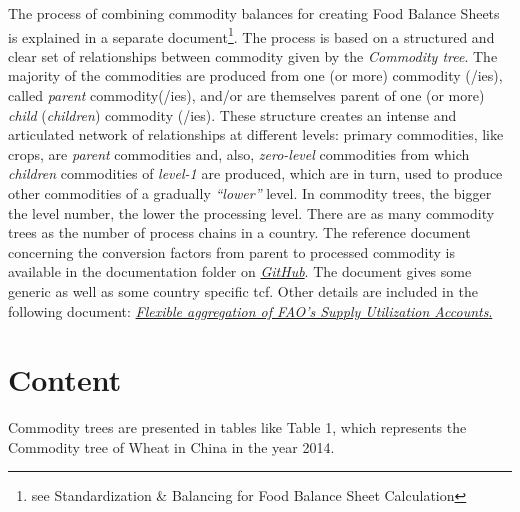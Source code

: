 \documentclass[]{article}
\let\rmarkdownfootnote\footnote%
\def\footnote{\protect\rmarkdownfootnote}
\begin{document}
The process of combining commodity balances for creating Food Balance
Sheets is explained in a separate document\footnote{see Standardization
  \& Balancing for Food Balance Sheet Calculation}. The process is based
on a structured and clear set of relationships between commodity given
by the \emph{Commodity tree}. The majority of the commodities are
produced from one (or more) commodity (/ies), called \emph{parent}
commodity(/ies), and/or are themselves parent of one (or more)
\emph{child} (\emph{children}) commodity (/ies). These structure creates
an intense and articulated network of relationships at different levels:
primary commodities, like crops, are \emph{parent} commodities and,
also, \emph{zero-level} commodities from which \emph{children}
commodities of \emph{level-1} are produced, which are in turn, used to
produce other commodities of a gradually \emph{``lower''} level. In
commodity trees, the bigger the level number, the lower the processing
level. There are as many commodity trees as the number of process chains
in a country. The reference document concerning the conversion factors
from parent to processed commodity is available in the documentation
folder on
\href{https://github.com/SWS-Methodology/faoswsStandardization/tree/master/documentation}{\emph{GitHub}}.
The document gives some generic as well as some country specific tcf.
Other details are included in the following document:
\href{https://github.com/SWS-Methodology/faoswsStandardization/blob/master/documentation/flexible_aggregation_of_FAO_supply_utilization_account.pdf}{\emph{Flexible
aggregation of FAO's Supply Utilization Accounts}.}

\section{Content}\label{content}

Commodity trees are presented in tables like Table 1, which represents
the Commodity tree of Wheat in China in the year 2014.
\end{document}
